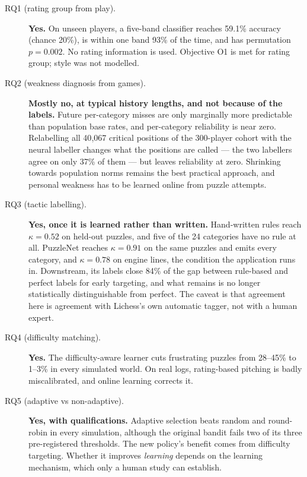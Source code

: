 \begin{description}
  \item[RQ1 (rating group from play).] \textbf{Yes.} On unseen players, a five-band classifier reaches
        59.1\% accuracy (chance 20\%), is within one band 93\% of the time, and has permutation
        $p=0.002$. No rating information is used. Objective O1 is met for rating group; style was not
        modelled.
  \item[RQ2 (weakness diagnosis from games).] \textbf{Mostly no, at typical history lengths, and not
        because of the labels.} Future per-category misses are only marginally more predictable than
        population base rates, and per-category reliability is near zero. Relabelling all 40{,}067
        critical positions of the 300-player cohort with the neural labeller changes what the positions
        are called --- the two labellers agree on only 37\% of them --- but leaves reliability at zero.
        Shrinking towards population norms remains the best practical approach, and personal weakness has
        to be learned online from puzzle attempts.
  \item[RQ3 (tactic labelling).] \textbf{Yes, once it is learned rather than written.} Hand-written
        rules reach $\kappa = 0.52$ on held-out puzzles, and five of the 24 categories have no rule at
        all. PuzzleNet reaches $\kappa = 0.91$ on the same puzzles and emits every category, and $\kappa =
        0.78$ on engine lines, the condition the application runs in. Downstream, its labels close 84\% of
        the gap between rule-based and perfect labels for early targeting, and what remains is no longer
        statistically distinguishable from perfect. The caveat is that agreement here is agreement with
        Lichess's own automatic tagger, not with a human expert.
  \item[RQ4 (difficulty matching).] \textbf{Yes.} The difficulty-aware learner cuts frustrating puzzles
        from 28--45\% to 1--3\% in every simulated world. On real logs, rating-based pitching is badly
        miscalibrated, and online learning corrects it.
  \item[RQ5 (adaptive vs non-adaptive).] \textbf{Yes, with qualifications.} Adaptive selection beats
        random and round-robin in every simulation, although the original bandit fails two of its
        three pre-registered thresholds. The new policy's benefit comes from difficulty targeting.
        Whether it improves \emph{learning} depends on the learning mechanism, which only a human study
        can establish.
\end{description}

